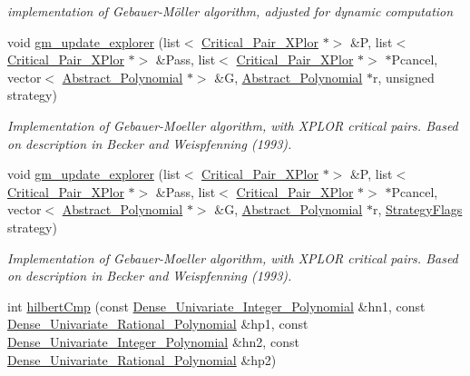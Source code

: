 \begin{DoxyCompactItemize}
\begin{DoxyCompactList}\small\item\em implementation of Gebauer-\/M\"{o}ller algorithm, adjusted for dynamic computation \end{DoxyCompactList}\item 
void \hyperlink{group___g_b_computation_gabea57aedc3f652eba7890574dda52f08}{gm\+\_\+update\+\_\+explorer} (list$<$ \hyperlink{group___g_b_computation_class_critical___pair___x_plor}{Critical\+\_\+\+Pair\+\_\+\+X\+Plor} $\ast$$>$ \&P, list$<$ \hyperlink{group___g_b_computation_class_critical___pair___x_plor}{Critical\+\_\+\+Pair\+\_\+\+X\+Plor} $\ast$$>$ \&Pass, list$<$ \hyperlink{group___g_b_computation_class_critical___pair___x_plor}{Critical\+\_\+\+Pair\+\_\+\+X\+Plor} $\ast$$>$ $\ast$Pcancel, vector$<$ \hyperlink{group__polygroup_class_abstract___polynomial}{Abstract\+\_\+\+Polynomial} $\ast$$>$ \&G, \hyperlink{group__polygroup_class_abstract___polynomial}{Abstract\+\_\+\+Polynomial} $\ast$r, unsigned strategy)
\begin{DoxyCompactList}\small\item\em Implementation of Gebauer-\/\+Moeller algorithm, with X\+P\+L\+OR critical pairs. Based on description in Becker and Weispfenning (1993). \end{DoxyCompactList}\item 
void \hyperlink{group___g_b_computation_gab3006092b36dd11b4f06053e8dab6f19}{gm\+\_\+update\+\_\+explorer} (list$<$ \hyperlink{group___g_b_computation_class_critical___pair___x_plor}{Critical\+\_\+\+Pair\+\_\+\+X\+Plor} $\ast$$>$ \&P, list$<$ \hyperlink{group___g_b_computation_class_critical___pair___x_plor}{Critical\+\_\+\+Pair\+\_\+\+X\+Plor} $\ast$$>$ \&Pass, list$<$ \hyperlink{group___g_b_computation_class_critical___pair___x_plor}{Critical\+\_\+\+Pair\+\_\+\+X\+Plor} $\ast$$>$ $\ast$Pcancel, vector$<$ \hyperlink{group__polygroup_class_abstract___polynomial}{Abstract\+\_\+\+Polynomial} $\ast$$>$ \&G, \hyperlink{group__polygroup_class_abstract___polynomial}{Abstract\+\_\+\+Polynomial} $\ast$r, \hyperlink{group__strategygroup_ga0ee6c8e033547330e6b89929730007f4}{Strategy\+Flags} strategy)
\begin{DoxyCompactList}\small\item\em Implementation of Gebauer-\/\+Moeller algorithm, with X\+P\+L\+OR critical pairs. Based on description in Becker and Weispfenning (1993). \end{DoxyCompactList}\item 
int \hyperlink{group___g_b_computation_ga70044fbc239244cda86cc6be0657bd0d}{hilbert\+Cmp} (const \hyperlink{group__polygroup_class_dense___univariate___integer___polynomial}{Dense\+\_\+\+Univariate\+\_\+\+Integer\+\_\+\+Polynomial} \&hn1, const \hyperlink{group__polygroup_class_dense___univariate___rational___polynomial}{Dense\+\_\+\+Univariate\+\_\+\+Rational\+\_\+\+Polynomial} \&hp1, const \hyperlink{group__polygroup_class_dense___univariate___integer___polynomial}{Dense\+\_\+\+Univariate\+\_\+\+Integer\+\_\+\+Polynomial} \&hn2, const \hyperlink{group__polygroup_class_dense___univariate___rational___polynomial}{Dense\+\_\+\+Univariate\+\_\+\+Rational\+\_\+\+Polynomial} \&hp2)

\end{DoxyCompactItemize}
